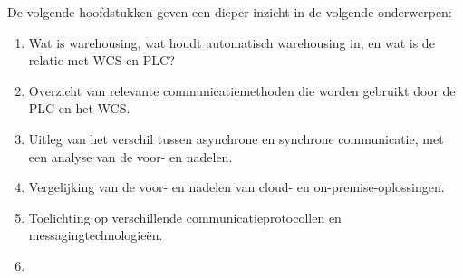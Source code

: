 




De volgende hoofdstukken geven een dieper inzicht in de volgende onderwerpen:
\begin{enumerate}
  \item Wat is warehousing, wat houdt automatisch warehousing in, en wat is de relatie met WCS en PLC?
  \item Overzicht van relevante communicatiemethoden die worden gebruikt door de PLC en het WCS.
  \item Uitleg van het verschil tussen asynchrone en synchrone communicatie, met een analyse van de voor- en nadelen.
  \item Vergelijking van de voor- en nadelen van cloud- en on-premise-oplossingen.
  \item Toelichting op verschillende communicatieprotocollen en messagingtechnologieën.
  \item 
\end{enumerate}

